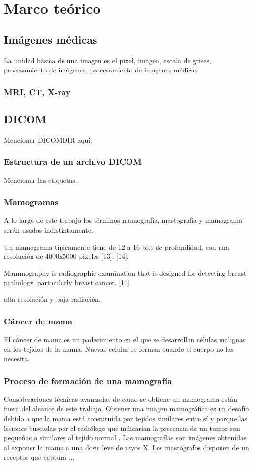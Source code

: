 \chapter{Marco teórico}

\section{Imágenes médicas}
La unidad básica de una imagen es el pixel, imagen, escala de grises,
procesamiento de imágenes, procesamiento de imágenes médicas

\subsection{MRI, CT, X-ray}

\section{DICOM}
Mencionar DICOMDIR aquí.

\subsection{Estructura de un archivo DICOM}
Mencionar las etiquetas.

\subsection{Mamogramas}
A lo largo de este trabajo los términos mamografía, mastografía y mamograma
serán usados indistintamente. 

Un mamograma típicamente tiene de 12 a 16 bits de profundidad, con una
resolución de 4000x5000 pixeles [13], [14].  

Mammography is radiographic examination that is designed for detecting breast
pathology, particularly breast cancer. [11]

alta resolución y baja radiación.

\subsection{Cáncer de mama} %
El cáncer de mama es un padecimiento en el que se desarrollan células malignas
en los tejidos de la mama. Nuevas celulas se forman cuando el cuerpo no las
necesita. 

\subsection{Proceso de formación de una mamografía}
Consideraciones técnicas avanzadas de cómo se obtiene un mamograma están fuera
del alcance de este trabajo. Obtener una imagen mamográfica es un desafío
debido a que la mama está constituida por tejidos similares entre sí y porque
las lesiones buscadas por el radiólogo que indicarían la presencia de un tumor
son pequeñas o similares al tejido normal \cite{mx:cancer}. Las mamografías son
imágenes obtenidas al exponer la mama a una dosis leve de rayos X. Los
mastógrafos disponen de un receptor que captura ...

